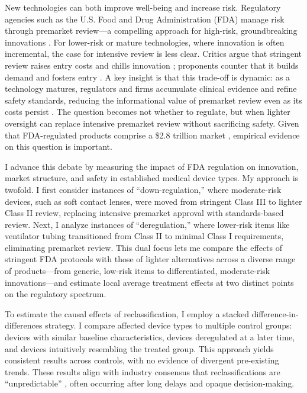 \documentclass[letterpaper,12pt]{article}
\theoremstyle{definition}
\begin{document}
New technologies can both improve well-being and increase risk. Regulatory agencies such as the U.S. Food and Drug Administration (FDA) manage risk through premarket review---a compelling approach for high-risk, groundbreaking innovations \citep{Grennan:2020}. For lower-risk or mature technologies, where innovation is often incremental, the case for intensive review is less clear. Critics argue that stringent review raises entry costs and chills innovation \citep{peltzman1973evaluation}; proponents counter that it builds demand and fosters entry \citep{carpenter2010approval}. A key insight is that this trade-off is dynamic: as a technology matures, regulators and firms accumulate clinical evidence and refine safety standards, reducing the informational value of premarket review even as its costs persist \citep{henry2022regulation}. The question becomes not whether to regulate, but when lighter oversight can replace intensive premarket review without sacrificing safety. Given that FDA-regulated products comprise a \$2.8 trillion market \citep{FDAFactsheet2020}, empirical evidence on this question is important.

I advance this debate by measuring the impact of FDA regulation on innovation, market structure, and safety in established medical device types. My approach is twofold. I first consider instances of ``down-regulation,'' where moderate-risk devices, such as soft contact lenses, were moved from stringent Class III to lighter Class II review, replacing intensive premarket approval with standards-based review. Next, I analyze instances of ``deregulation,'' where lower-risk items like ventilator tubing transitioned from Class II to minimal Class I requirements, eliminating premarket review. This dual focus lets me compare the effects of stringent FDA protocols with those of lighter alternatives across a diverse range of products---from generic, low-risk items to differentiated, moderate-risk innovations---and estimate local average treatment effects at two distinct points on the regulatory spectrum.


To estimate the causal effects of reclassification, I employ a stacked difference-in-differences strategy. I compare affected device types to multiple control groups: devices with similar baseline characteristics, devices deregulated at a later time, and devices intuitively resembling the treated group. This approach yields consistent results across controls, with no evidence of divergent pre-existing trends. These results align with industry consensus that reclassifications are ``unpredictable'' \citep{Makower:2010, powell2018changing}, often occurring after long delays and opaque decision-making.
\end{document}

